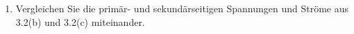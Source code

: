 \begin{enumerate}[label=\alph*)]
	\item Vergleichen Sie die primär- und sekundärseitigen Spannungen und Ströme aus
	      3.2(b) und 3.2(c) miteinander.

\end{enumerate}
